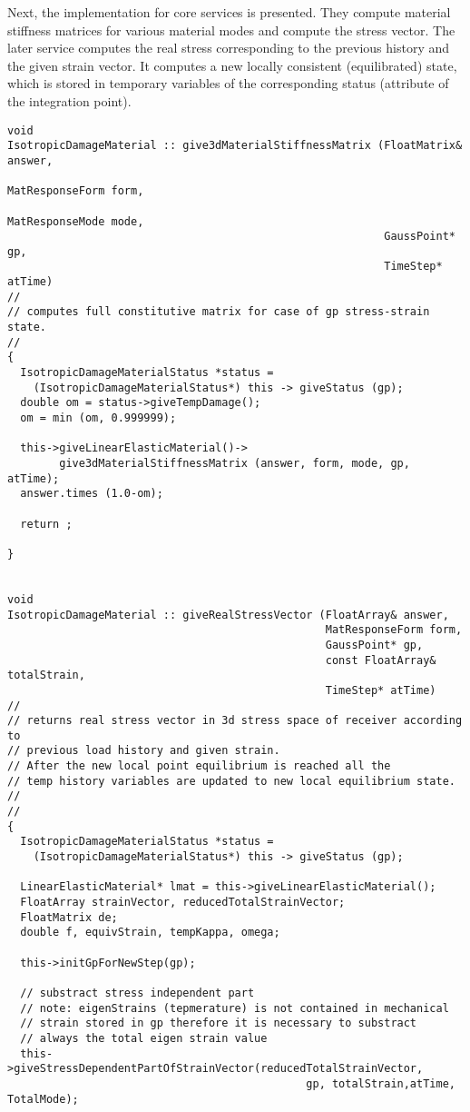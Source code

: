 \documentclass[12pt,draft]{article}
\begin{document}
Next, the implementation for core services is presented. They compute 
material stiffness matrices for various material modes and compute 
the stress vector. The later service computes the real stress
corresponding to the previous history and the given strain vector. It computes
a new locally consistent (equilibrated) state, which is stored in temporary
variables of the corresponding status (attribute of the integration point). 

{\small
\begin{verbatim}
void
IsotropicDamageMaterial :: give3dMaterialStiffnessMatrix (FloatMatrix& answer, 
                                                          MatResponseForm form,
                                                          MatResponseMode mode,
                                                          GaussPoint* gp,
                                                          TimeStep* atTime)
//
// computes full constitutive matrix for case of gp stress-strain state.
//
{
  IsotropicDamageMaterialStatus *status =
    (IsotropicDamageMaterialStatus*) this -> giveStatus (gp);
  double om = status->giveTempDamage();
  om = min (om, 0.999999);

  this->giveLinearElasticMaterial()->
        give3dMaterialStiffnessMatrix (answer, form, mode, gp, atTime);
  answer.times (1.0-om);

  return ;
  
}


void
IsotropicDamageMaterial :: giveRealStressVector (FloatArray& answer, 
                                                 MatResponseForm form, 
                                                 GaussPoint* gp, 
                                                 const FloatArray& totalStrain, 
                                                 TimeStep* atTime)
//
// returns real stress vector in 3d stress space of receiver according to 
// previous load history and given strain.
// After the new local point equilibrium is reached all the
// temp history variables are updated to new local equilibrium state.
// 
//
{
  IsotropicDamageMaterialStatus *status = 
    (IsotropicDamageMaterialStatus*) this -> giveStatus (gp);

  LinearElasticMaterial* lmat = this->giveLinearElasticMaterial();
  FloatArray strainVector, reducedTotalStrainVector;
  FloatMatrix de;
  double f, equivStrain, tempKappa, omega; 

  this->initGpForNewStep(gp);

  // substract stress independent part
  // note: eigenStrains (tepmerature) is not contained in mechanical
  // strain stored in gp therefore it is necessary to substract 
  // always the total eigen strain value
  this->giveStressDependentPartOfStrainVector(reducedTotalStrainVector,
                                              gp, totalStrain,atTime, TotalMode);


\end{verbatim}}
\end{document}
